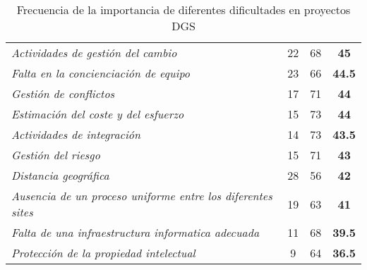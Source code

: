 \begin{table}[htbp]
{\begin{tabular}{lccc|}
        \rowcolor[rgb]{ .949,  .949,  .949} \textit{Actividades de gestión del cambio} & \cellcolor[rgb]{ 1,  1,  1}22 & \cellcolor[rgb]{ 1,  1,  1}68 & \cellcolor[rgb]{ 1,  1,  1}\textbf{45} \\
        \rowcolor[rgb]{ .949,  .949,  .949} \textit{Falta en la concienciación de equipo} & \cellcolor[rgb]{ 1,  1,  1}23 & \cellcolor[rgb]{ 1,  1,  1}66 & \cellcolor[rgb]{ 1,  1,  1}\textbf{44.5} \\
        \rowcolor[rgb]{ .949,  .949,  .949} \textit{Gestión de conflictos} & \cellcolor[rgb]{ 1,  1,  1}17 & \cellcolor[rgb]{ 1,  1,  1}71 & \cellcolor[rgb]{ 1,  1,  1}\textbf{44} \\
        \rowcolor[rgb]{ .949,  .949,  .949} \textit{Estimación del coste y del esfuerzo} & \cellcolor[rgb]{ 1,  1,  1}15 & \cellcolor[rgb]{ 1,  1,  1}73 & \cellcolor[rgb]{ 1,  1,  1}\textbf{44} \\
        \rowcolor[rgb]{ .949,  .949,  .949} \textit{Actividades de integración} & \cellcolor[rgb]{ 1,  1,  1}14 & \cellcolor[rgb]{ 1,  1,  1}73 & \cellcolor[rgb]{ 1,  1,  1}\textbf{43.5} \\
        \rowcolor[rgb]{ .949,  .949,  .949} \textit{Gestión del riesgo} & \cellcolor[rgb]{ 1,  1,  1}15 & \cellcolor[rgb]{ 1,  1,  1}71 & \cellcolor[rgb]{ 1,  1,  1}\textbf{43} \\
        \rowcolor[rgb]{ .949,  .949,  .949} \textit{Distancia geográfica} & \cellcolor[rgb]{ 1,  1,  1}28 & \cellcolor[rgb]{ 1,  1,  1}56 & \cellcolor[rgb]{ 1,  1,  1}\textbf{42} \\
        \rowcolor[rgb]{ .949,  .949,  .949} \textit{Ausencia de un proceso uniforme entre los diferentes sites} & \cellcolor[rgb]{ 1,  1,  1}19 & \cellcolor[rgb]{ 1,  1,  1}63 & \cellcolor[rgb]{ 1,  1,  1}\textbf{41} \\
        \rowcolor[rgb]{ .949,  .949,  .949} \textit{Falta de una infraestructura informatica adecuada} & \cellcolor[rgb]{ 1,  1,  1}11 & \cellcolor[rgb]{ 1,  1,  1}68 & \cellcolor[rgb]{ 1,  1,  1}\textbf{39.5} \\
        \rowcolor[rgb]{ .949,  .949,  .949} \textit{Protección de la propiedad intelectual} & \cellcolor[rgb]{ 1,  1,  1}9 & \cellcolor[rgb]{ 1,  1,  1}64 & \cellcolor[rgb]{ 1,  1,  1}\textbf{36.5} \\
    \end{tabular}}
  \caption{Frecuencia de la importancia de diferentes dificultades en proyectos DGS}
  \label{tab:DificultadesDGS}
\end{table}

